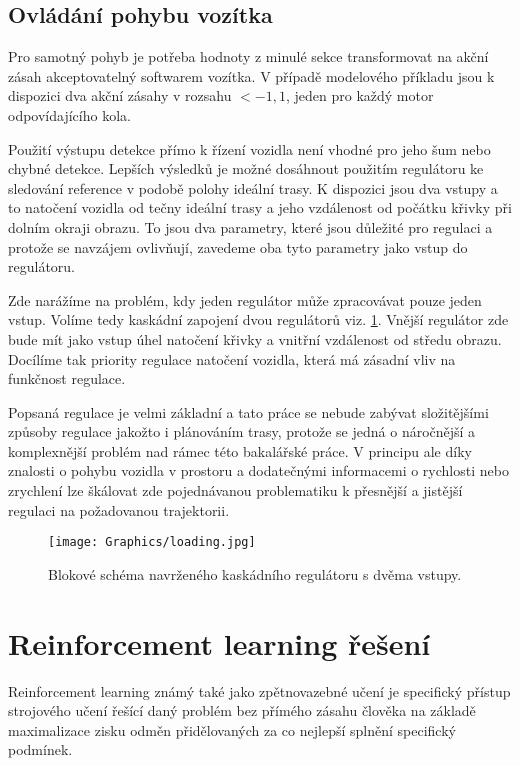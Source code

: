 \documentclass[czech, bc, kky, he, iso690alph]{fasthesis}
\begin{document}
            \subsection{Ovládání pohybu vozítka}
            	Pro samotný pohyb je potřeba hodnoty z minulé sekce transformovat na akční zásah akceptovatelný softwarem vozítka. V případě modelového příkladu jsou k dispozici dva akční zásahy v rozsahu \(<-1,1\), jeden pro každý motor odpovídajícího kola.
            	
                Použití výstupu detekce přímo k řízení vozidla není vhodné pro jeho šum nebo chybné detekce. Lepších výsledků je možné dosáhnout použitím regulátoru ke sledování reference v podobě polohy ideální trasy. K dispozici jsou dva vstupy a to natočení vozidla od tečny ideální trasy a jeho vzdálenost od počátku křivky při dolním okraji obrazu. To jsou dva parametry, které jsou důležité pro regulaci a protože se navzájem ovlivňují, zavedeme oba tyto parametry jako vstup do regulátoru.
                
                Zde narážíme na problém, kdy jeden regulátor může zpracovávat pouze jeden vstup. Volíme tedy kaskádní zapojení dvou regulátorů viz. \ref{pic:regulator_schema}. Vnější regulátor zde bude mít jako vstup úhel natočení křivky a vnitřní vzdálenost od středu obrazu. Docílíme tak priority regulace natočení vozidla, která má zásadní vliv na funkčnost regulace.
                
                Popsaná regulace je velmi základní a tato práce se nebude zabývat složitějšími způsoby regulace jakožto i plánováním trasy, protože se jedná o náročnější a komplexnější problém nad rámec této bakalářské práce. V principu ale díky znalosti o pohybu vozidla v prostoru a dodatečnými informacemi o rychlosti nebo zrychlení lze škálovat zde pojednávanou problematiku k přesnější a jistější regulaci na požadovanou trajektorii.
                
                \begin{figure}[h]
                	\centering
                	\texttt{[image: Graphics/loading.jpg]}
                	\caption{Blokové schéma navrženého kaskádního regulátoru s dvěma vstupy.}
                	\label{pic:regulator_schema}
                \end{figure}
            
        \section{Reinforcement learning řešení}
            Reinforcement learning známý také jako zpětnovazebné učení je specifický přístup strojového učení řešící daný problém bez přímého zásahu člověka na základě maximalizace zisku odměn přidělovaných za co nejlepší splnění specifický podmínek.
            
\end{document}
